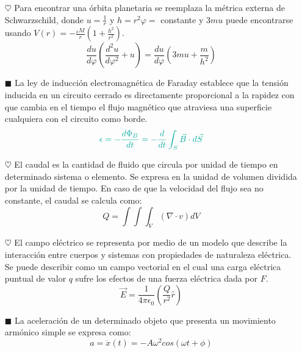 \documentclass[letterpaper,12pt]{article}
\begin{document}
\begin{itemize}
    \item [$\heartsuit$] Para encontrar una órbita planetaria se reemplaza la métrica externa de Schwarzschild, donde $u=\tfrac{1}{r}$ y $h= r^2\varphi=$ constante y $3mu$ puede encontrarse usando $V(r) = -\tfrac{_kM}{r}(1 + \tfrac{h^2}{r^2})$.
    \begin{equation*}
        \frac{du}{d\varphi} \left(\frac{d^2 u}{d \varphi^2} + u \right) = \frac{du}{d\varphi} \left(3mu + \frac{m}{h^2}  \right) 
    \end{equation*}
    
    \item [$\blacksquare$] La ley de inducción electromagnética de Faraday establece que la tensión inducida en un circuito cerrado es directamente proporcional a la rapidez con que cambia en el tiempo el flujo magnético que atraviesa una superficie cualquiera con el circuito como borde.
    \begin{equation*}
        \textcolor{JungleGreen} {\epsilon = - \frac{d\Phi_B}{dt}= - \frac{d}{dt} \int_{S} \vec{B} \cdot d\vec{S}}
    \end{equation*}
    
    \item [$\heartsuit$] El caudal es la cantidad de fluido que circula por unidad de tiempo en determinado sistema o elemento. Se expresa en la unidad de volumen dividida por la unidad de tiempo. En caso de que la velocidad del flujo sea no constante, el caudal se calcula como:
    \begin{equation*}
        Q = \int\int\int_{V} (\nabla \cdot v) dV
    \end{equation*}
    
    \item [$\heartsuit$] El campo eléctrico se representa por medio de un modelo que describe la interacción entre cuerpos y sistemas con propiedades de naturaleza eléctrica. Se puede describir como un campo vectorial en el cual una carga eléctrica puntual de valor $q$ sufre los efectos de una fuerza eléctrica dada por $F$.
    \begin{equation*}
        \vec{E} = \frac{1}{4\pi \epsilon_0} \left(\frac{Q}{r^2} \hat{r}\right)
    \end{equation*}
    
    \item [$\blacksquare$] La aceleración de un determinado objeto que presenta un movimiento armónico simple se expresa como:
    \begin{equation*}
        a= \ddot{x}(t) = -A\omega^2 cos(\omega t + \phi)
    \end{equation*}
    

\end{itemize}
\end{document}
